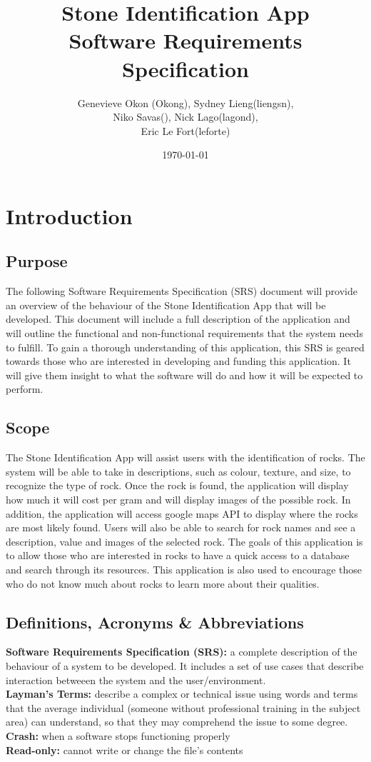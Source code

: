 \documentclass[titlepage]{article}
\begin{document}
	\title{Stone Identification App \\
		Software Requirements Specification}
	\author{Genevieve Okon (Okong), Sydney Lieng(liengsn),\\
		Niko Savas(), Nick Lago(lagond),\\
		Eric Le Fort(leforte)}
	\date{\today}
	\maketitle
	
\section{Introduction}
\subsection{Purpose}
The following Software Requirements Specification (SRS) document will provide an overview of the behaviour of the Stone Identification App that will be developed. This document will include a full description of the application and will outline the functional and non-functional requirements that the system needs to fulfill. To gain a thorough understanding of this application, this SRS is geared towards those who are interested in developing and funding this application. It will give them insight to what the software will do and how it will be expected to perform.
\subsection{Scope}
The Stone Identification App will assist users with the identification of rocks. The system will be able to take in descriptions, such as colour, texture, and size, to recognize the type of rock. Once the rock is found, the application will display how much it will cost per gram and will display images of the possible rock. In addition, the application will access google maps API to display where the rocks are most likely found. Users will also be able to search for rock names and see a description, value and images of the selected rock. The goals of this application is to allow those who are interested in rocks to have a quick access to a database and search through its resources. This application is also used to encourage those who do not know much about rocks to learn more about their qualities. 
\subsection{Definitions, Acronyms \& Abbreviations}
\textbf{Software Requirements Specification (SRS):} a complete description of the behaviour of a system to be developed. It includes a set of use cases that describe interaction betweeen the system and the user/environment.\\
\textbf{Layman's Terms:} describe a complex or technical issue using words and terms that the average individual (someone without professional training in the subject area) can understand, so that they may comprehend the issue to some degree.\\
\textbf{Crash:} when a software stops functioning properly\\
\textbf{Read-only:} cannot write or change the file's contents
\end{document}
